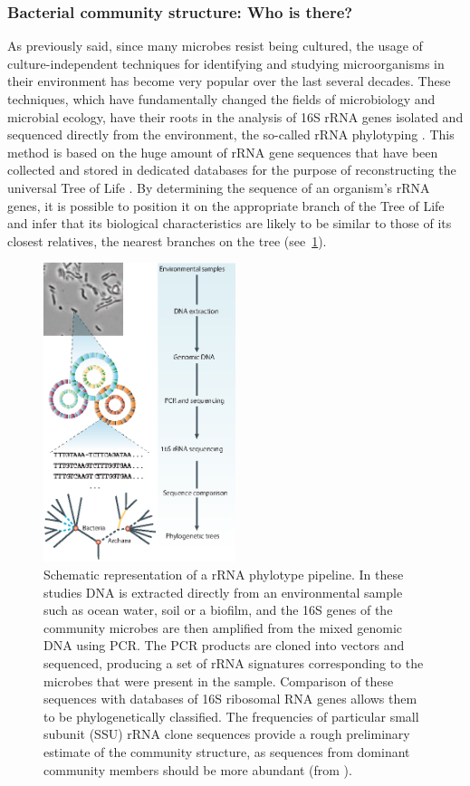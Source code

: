\subsubsection{Bacterial community structure: Who is there? \label{par:whois}}
As previously said, since many microbes resist being cultured, the usage of culture-independent techniques for identifying and studying microorganisms in their environment has become very popular over the last several decades. These techniques, which have fundamentally changed the fields of microbiology and microbial ecology, have their roots in the analysis of 16S rRNA genes isolated and sequenced directly from the environment, the so-called rRNA phylotyping \cite{pace1997molecular, olsen1986microbial}. This method is based on the huge amount of rRNA gene sequences that have been collected and stored in dedicated databases for the purpose of reconstructing the universal Tree of Life \cite{brown2002universal}. By determining the sequence of an organism’s rRNA genes, it is possible to position it on the appropriate branch of the Tree of Life and infer that its biological characteristics are likely to be similar to those of its closest relatives, the nearest branches on the tree (see~\ref{fig:rnaphylo}).\\
\begin{figure}[!tb]
	\centering
	\includegraphics[width=0.5\textwidth]{./figures/Introduction/rna_phylotyping}
  	\caption{Schematic representation of a rRNA phylotype pipeline. In these studies DNA is extracted directly from an environmental sample such as ocean water, soil or a biofilm, and the 16S genes of the community microbes are then amplified from the mixed genomic DNA using PCR. The PCR products are cloned into vectors and sequenced, producing a set of rRNA signatures corresponding to the microbes that were present in the sample. Comparison of these sequences with databases of 16S ribosomal RNA genes allows them to be phylogenetically classified. The frequencies of particular small subunit (SSU) rRNA clone sequences provide a rough preliminary estimate of the community structure, as sequences from dominant community members should be more abundant (from \cite{tringe2005metagenomics}).\label{fig:rnaphylo}}
\end{figure}

